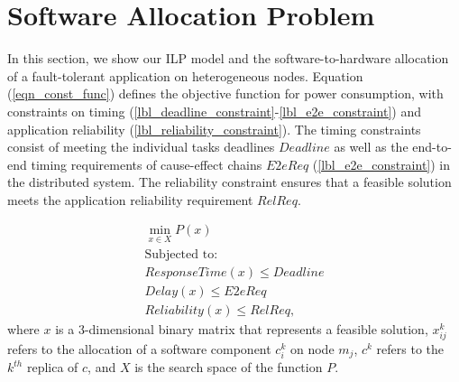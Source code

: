 \section{Software Allocation Problem}\label{sec_allocation}
In this section, we show our ILP model and the software-to-hardware allocation of a fault-tolerant application on heterogeneous nodes. Equation (\ref{eqn_const_func}) defines the objective function for power consumption, with constraints on timing (\ref{lbl_deadline_constraint}-\ref{lbl_e2e_constraint}) and application reliability (\ref{lbl_reliability_constraint}). 
The timing constraints consist of meeting the individual tasks deadlines $Deadline$  as well as the end-to-end timing requirements of cause-effect chains $E2eReq$ (\ref{lbl_e2e_constraint}) in the distributed system. The reliability constraint ensures that a feasible solution meets the application reliability requirement $RelReq$. 

\begin{align}
\label{eqn_const_func}
\min_{x\in X} P(x) \\
\text{Subjected to:}\nonumber\\
\label{lbl_deadline_constraint} 
ResponseTime(x) \leq Deadline\\ 
\label{lbl_e2e_constraint}
Delay(x) \leq E2eReq \\
\label{lbl_reliability_constraint}
Reliability(x) \leq RelReq,
\end{align}
where $x$ is a 3-dimensional binary matrix that represents a feasible solution, $x^k_{ij}$ refers to the allocation of a software component $c^k_i$ on node $m_j$, $c^k$ refers to the $k^{th}$ replica of $c$, and $X$ is the search space of the function $P$. 

